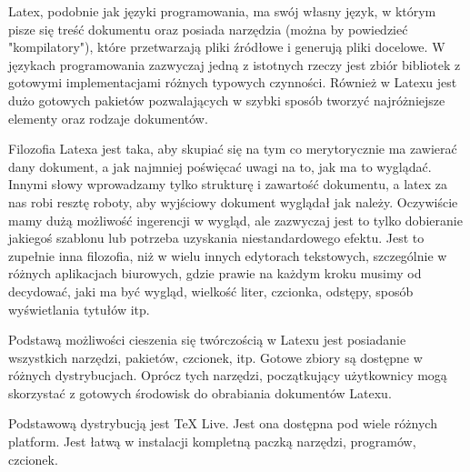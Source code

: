 Latex, podobnie jak języki programowania, ma swój własny język, w którym pisze się treść dokumentu oraz posiada narzędzia (można by powiedzieć "kompilatory"), które przetwarzają pliki źródłowe i generują pliki docelowe. W językach programowania zazwyczaj jedną z istotnych rzeczy jest zbiór bibliotek z gotowymi implementacjami różnych typowych czynności. Również w Latexu jest dużo gotowych pakietów pozwalających w szybki sposób tworzyć najróżniejsze elementy oraz rodzaje dokumentów.\newline

Filozofia Latexa jest taka, aby skupiać się na tym co merytorycznie ma zawierać dany dokument, a jak najmniej poświęcać uwagi na to, jak ma to wyglądać. Innymi słowy wprowadzamy tylko strukturę i zawartość dokumentu, a latex za nas robi resztę roboty, aby wyjściowy dokument wyglądał jak należy. Oczywiście mamy dużą możliwość ingerencji w wygląd, ale zazwyczaj jest to tylko dobieranie jakiegoś szablonu lub potrzeba uzyskania niestandardowego efektu. Jest to zupełnie inna filozofia, niż w wielu innych edytorach tekstowych, szczególnie w różnych aplikacjach biurowych, gdzie prawie na każdym kroku musimy od decydować, jaki ma być wygląd, wielkość liter, czcionka, odstępy, sposób wyświetlania tytułów itp.\newline
 
Podstawą możliwości cieszenia się twórczością w Latexu jest posiadanie wszystkich narzędzi, pakietów, czcionek, itp. Gotowe zbiory są dostępne w różnych dystrybucjach. Oprócz tych narzędzi, początkujący użytkownicy mogą skorzystać z gotowych środowisk do obrabiania dokumentów Latexu.\newline

Podstawową dystrybucją jest TeX Live. Jest ona dostępna pod wiele różnych platform. Jest łatwą w instalacji kompletną paczką narzędzi, programów, czcionek.

\newpage


